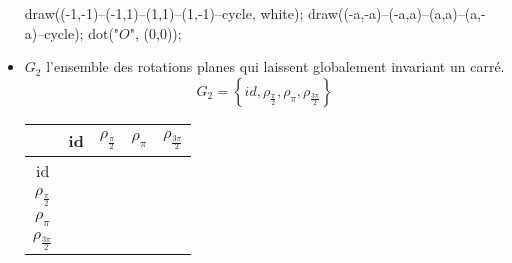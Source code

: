 \begin{exm}
\begin{itemize}
\begin{center}
\begin{asy}
					draw((-1,-1)--(-1,1)--(1,1)--(1,-1)--cycle, white);
					draw((-a,-a)--(-a,a)--(a,a)--(a,-a)--cycle);
					dot("$O$", (0,0));
				\end{asy}
			\end{center}
		\item $G_2$ l'ensemble des rotations planes qui laissent globalement invariant un carré.
			\[
				G_2 = \left\{ id, \rho_{\frac{\pi}{2}}, \rho_{\pi}, \rho_{\frac{3\pi}{2}} \right\}
			\] 
			\begin{center}
				\begin{tabular}{|c|c|c|c|c|}
					\hline
					\diagbox{$y$}{$x$} & id & $\rho_\frac{\pi}{2}$ & $\rho_\pi$ & $\rho_\frac{3\pi}{2}$\\\hline
					id & \color{orange}{id} & \color{green}{$\rho_\frac{\pi}{2}$} & \color{cyan}{$\rho_\pi$} & \color{magenta}{$\rho_\frac{3\pi}{2}$}\\\hline
					$\rho_\frac{\pi}{2}$ & \color{green}{$\rho_\frac{\pi}{2}$} & \color{cyan}{$\rho_\pi$} & \color{magenta}{$\rho_\frac{3\pi}{2}$} & \color{orange}{id}\\\hline
					$ \rho_\pi$ & \color{cyan}{$\rho_\pi$} & \color{magenta}{$\rho_\frac{3\pi}{2}$} & \color{orange}{id} & \color{green}{$\rho_\frac{\pi}{2}$}\\\hline
					$ \rho_\frac{3\pi}{2}$ & \color{magenta}{$\rho_\frac{3\pi}{2}$} & \color{orange}{id} & \color{green}{$\rho_\frac{\pi}{2}$} & \color{cyan}{$\rho_\pi$}\\\hline
				\end{tabular}
			\end{center}


\end{itemize}
\end{exm}
